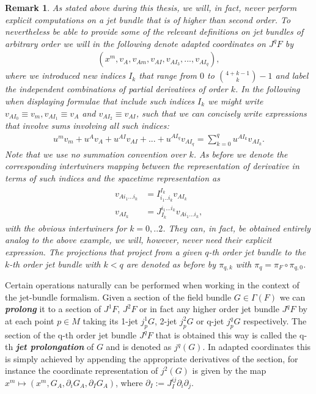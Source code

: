 \documentclass[a4paper,12pt, DIV=14, BCOR=5mm, twoside, headsepline, numbers=noenddot]{scrbook}
\newtheorem*{remark}{Remark}
\begin{document}
\begin{remark}
As stated above during this thesis, we will, in fact, never perform explicit computations on a jet bundle that is of higher than second order. To nevertheless be able to provide some of the relevant definitions on jet bundles of arbitrary order we will in the following denote adapted coordinates on $J^qF$ by 
\begin{align}
(x^m,v_A,v_{Am},v_{AI},v_{AI_{3}},...,v_{AI_{q}}),
\end{align}
where we introduced new indices $I_k$ that range from $0$ to $\binom{4+k-1}{k}-1$ and label the independent combinations of partial derivatives of order $k$. In the following when displaying formulae that include such indices $I_k$ we might write $v_{AI_0} \equiv v_m, v_{AI_1} \equiv v_A$ and $v_{AI_2} \equiv v_{AI}$, such that we can concisely write expressions that involve sums involving all such indices:
\begin{align}
    u^mv_m + u^Av_A + u^{AI}v_{AI} + ... + u^{AI_q}v_{AI_q} = \sum _{k = 0}^q u^{AI_k}v_{AI_k}.
\end{align}
Note that we use no summation convention over $k$.
As before we denote the corresponding intertwiners mapping between the representation of derivative in terms of such indices and the spacetime representation as
\begin{align}
    \begin{aligned}
    v_{Ai_1...i_k} &= I^{I_k}_{i_1..i_k} v_{AI_k}\\
    v_{AI_k} &= J_{I_k}^{i_1...i_k} v_{Ai_1...i_k},
    \end{aligned}
\end{align}
with the obvious intertwiners for $k=0,..2$.
They can, in fact, be obtained entirely analog to the above example, we will, however, never need their explicit expression. 
The projections that project from a given $q$-th order jet bundle to the $k$-th order jet bundle with $k< q$ are denoted as before by $\pi_{q,k}$ with $\pi_q = \pi_F \circ \pi_{q,0}$.
\end{remark}

Certain operations naturally can be performed when working in the context of the jet-bundle formalism.
Given a section of the field bundle $G \in \Gamma(F)$ we can \textit{\textbf{prolong}} it to a section of $J^1F$, $J^2F$ or in fact any higher order jet bundle $J^qF$ by at each point $p \in M$ taking its 1-jet $j^1_pG$, 2-jet $j^2_pG$ or  q-jet $j^q_pG$ respectively. The section of the q-th order jet bundle $J^qF$ that is obtained this way is called the q-th \textbf{\textit{jet prolongation}} of $G$ and is denoted as $j^q(G)$. In adapted coordinates this is simply achieved by appending the appropriate derivatives of the section, for instance the coordinate representation of $j^2(G)$ is given by the map $x^m \mapsto (x^m, G_A, \partial_i G_A, \partial_I G_A)$, where $\partial_I := J_I^{ij} \partial_i \partial_j$.
\end{document}
